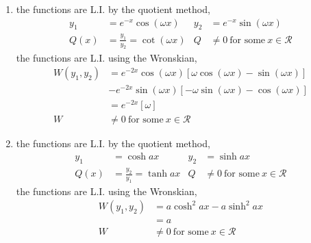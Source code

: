 \begin{enumerate}
    \item the functions are L.I. by the quotient method,
          \begin{align}
              y_{1} & = e^{-x}\cos(\omega x)                     &
              y_{2} & = e^{-x}\sin(\omega x)                       \\
              Q(x)  & = \frac{y_{1}}{y_{2}} = \cot(\omega x)     &
              Q     & \neq 0\ \text{for some}\ x \in \mathcal{R}
          \end{align}
          the functions are L.I. using the Wronskian,
          \begin{align}
              W(y_{1}, y_{2}) & = e^{-2x}\cos(\omega x)[\omega \cos(\omega x)
              - \sin(\omega x)]                                                \\
                              & - e^{-2x}\sin(\omega x)[-\omega \sin(\omega x)
              - \cos(\omega x)]                                                \\
                              & =e^{-2x}[\omega]                               \\
              W               & \neq 0\ \text{for some}\ x \in \mathcal{R}
          \end{align}

    \item the functions are L.I. by the quotient method,
          \begin{align}
              y_{1} & = \cosh ax                                 &
              y_{2} & = \sinh ax                                   \\
              Q(x)  & = \frac{y_{2}}{y_{1}} = \tanh ax           &
              Q     & \neq 0\ \text{for some}\ x \in \mathcal{R}
          \end{align}
          the functions are L.I. using the Wronskian,
          \begin{align}
              W(y_{1}, y_{2}) & = a\cosh^{2} ax - a\sinh^{2} ax            \\
                              & = a                                        \\
              W               & \neq 0\ \text{for some}\ x \in \mathcal{R}
          \end{align}


\end{enumerate}
